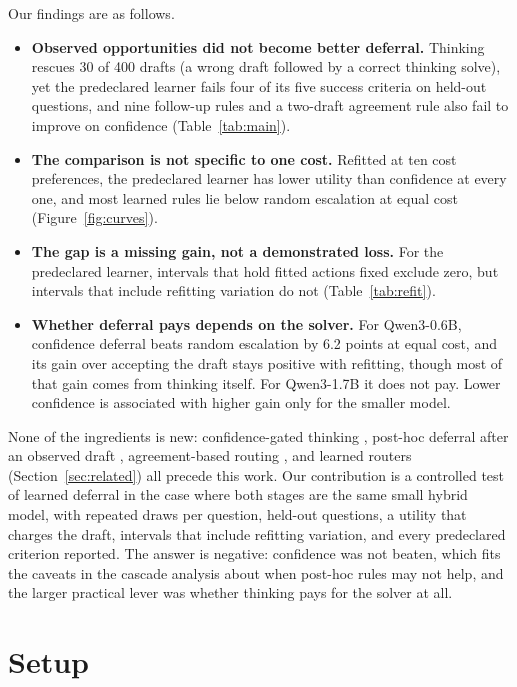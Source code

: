 \documentclass[10pt,letterpaper]{article}
\begin{document}
Our findings are as follows.
\begin{itemize}
\item \textbf{Observed opportunities did not become better deferral.} Thinking rescues 30 of 400 drafts (a wrong draft followed by a correct thinking solve), yet the predeclared learner fails four of its five success criteria on held-out questions, and nine follow-up rules and a two-draft agreement rule also fail to improve on confidence (Table~\ref{tab:main}).
\item \textbf{The comparison is not specific to one cost.} Refitted at ten cost preferences, the predeclared learner has lower utility than confidence at every one, and most learned rules lie below random escalation at equal cost (Figure~\ref{fig:curves}).
\item \textbf{The gap is a missing gain, not a demonstrated loss.} For the predeclared learner, intervals that hold fitted actions fixed exclude zero, but intervals that include refitting variation do not (Table~\ref{tab:refit}).
\item \textbf{Whether deferral pays depends on the solver.} For Qwen3-0.6B, confidence deferral beats random escalation by 6.2 points at equal cost, and its gain over accepting the draft stays positive with refitting, though most of that gain comes from thinking itself. For Qwen3-1.7B it does not pay. Lower confidence is associated with higher gain only for the smaller model.
\end{itemize}
None of the ingredients is new: confidence-gated thinking \citep{lewislim2026confidencegated}, post-hoc deferral after an observed draft \citep{jitkrittum2023cascade,gupta2024lmcascades}, agreement-based routing \citep{yue2024motcascade,lee2026dart}, and learned routers (Section~\ref{sec:related}) all precede this work. Our contribution is a controlled test of learned deferral in the case where both stages are the same small hybrid model, with repeated draws per question, held-out questions, a utility that charges the draft, intervals that include refitting variation, and every predeclared criterion reported. The answer is negative: confidence was not beaten, which fits the caveats in the cascade analysis about when post-hoc rules may not help, and the larger practical lever was whether thinking pays for the solver at all.

\section{Setup}
\label{sec:setup}
\end{document}
